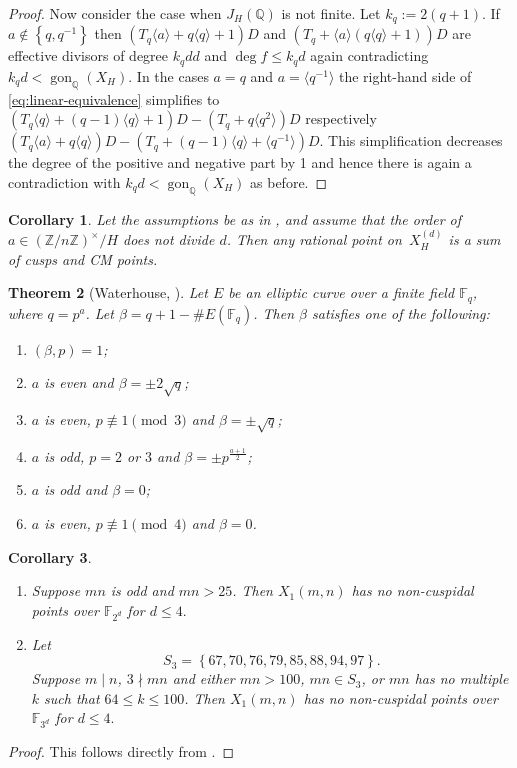 \documentclass[11pt,reqno]{amsart}
\DeclareMathOperator{\gon}{gon}
\newtheorem{theorem}{Theorem}[section]
\newtheorem{corollary}[theorem]{Corollary}
\theoremstyle{definition}
\numberwithin{equation}{section}
\newcommand{\Q}{\mathbb{Q}}
\newcommand{\Z}{\mathbb{Z}}
\newcommand{\F}{\mathbb{F}}
\newcommand{\diamondop}[1]{\langle #1 \rangle} %
\newcommand{\set}[1]{\left\lbrace #1 \right\rbrace}
\begin{document}
\begin{proof}
Now consider the case when $J_H(\Q)$ is not finite. Let $k_q:=2(q+1)$.
If $a \notin \set{q,q^{-1}}$ then $(T_q\diamondop{a}+q\diamondop{q}+1)D$ and $(T_q +\diamondop{a}(q\diamondop{q}+1))D$ are effective divisors of degree $k_qdd$ and $\deg f \leq k_qd$ again contradicting $k_qd < \gon_\Q(X_H).$
In the cases $a=q$ and $a=\diamondop{q^{-1}}$ the right-hand side of \eqref{eq:linear-equivalence} simplifies to $(T_q\diamondop{q}+(q-1)\diamondop{q}+1)D - (T_q +q\diamondop{q^2})D$ respectively $ (T_q\diamondop{a}+q\diamondop{q})D - (T_q +(q-1)\diamondop{q}+\diamondop{q^{-1}})D.$ This simplification decreases the degree of the positive and negative part by 1 and hence there is again a contradiction with $k_qd < \gon_\Q(X_H)$ as before.
         
\end{proof}

\begin{corollary}
    Let the assumptions be as in , and assume that the order of $a \in (\Z/n\Z)^\times/ H$ does not divide $d$. Then any rational point 
  on~$X_H^{(d)}$ is a sum of cusps and CM points.
\end{corollary}

\begin{theorem}[{Waterhouse, \cite[Theorem 4.1]{waterhouse69}}] \label{waterhouse}
Let $E$ be an elliptic curve over a finite field $\F_q$, where $q=p^a$. Let $\beta=q+1-\# E(\F_q)$. 
Then $\beta$ satisfies one of the following:
\begin{enumerate}
    \item $(\beta,p)=1$;
    \item $a$ is even and $\beta=\pm 2\sqrt q$;
    \item $a$ is even, $p\not\equiv 1 \pmod 3$ and $\beta=\pm \sqrt q$;
    \item $a$ is odd, $p=2$ or $3$ and $\beta=\pm p^{\frac{a+1}2}$;
    \item $a$ is odd and $\beta=0$;
    \item $a$ is even, $p\not\equiv 1 \pmod 4$ and $\beta=0$.
\end{enumerate}
\end{theorem}

\begin{corollary} \label{cor:curves_over_fp}

    \begin{enumerate}
        \item Suppose $mn$ is odd and $mn>25$. Then $X_1(m,n)$ has no non-cuspidal points over $\F_{2^d}$ for $d \leq 4.$

       \item Let 
        $$S_3=\left\{67,70,76,79,85,88,94,97\right\}.$$
        Suppose  $m \mid n$, $3\nmid mn$ and either $mn>100$, $mn\in S_3$, or $mn$ has no multiple $k$ such that $64\leq k\leq 100$. Then $X_1(m,n)$ has no non-cuspidal points over $\F_{3^d}$ for $d \leq 4.$
    \end{enumerate}
\end{corollary}
\begin{proof}
    This follows directly from .
\end{proof}
\end{document}

